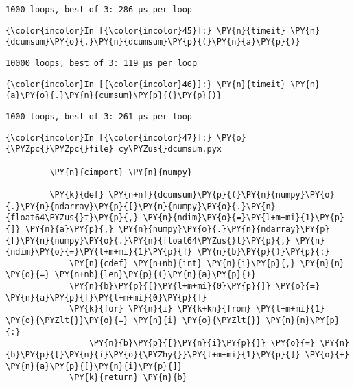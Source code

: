     \begin{Verbatim}[commandchars=\\\{\}]
1000 loops, best of 3: 286 µs per loop

    \end{Verbatim}

    \begin{Verbatim}[commandchars=\\\{\}]
{\color{incolor}In [{\color{incolor}45}]:} \PY{n}{timeit} \PY{n}{dcumsum}\PY{o}{.}\PY{n}{dcumsum}\PY{p}{(}\PY{n}{a}\PY{p}{)}
\end{Verbatim}

    \begin{Verbatim}[commandchars=\\\{\}]
10000 loops, best of 3: 119 µs per loop

    \end{Verbatim}

    \begin{Verbatim}[commandchars=\\\{\}]
{\color{incolor}In [{\color{incolor}46}]:} \PY{n}{timeit} \PY{n}{a}\PY{o}{.}\PY{n}{cumsum}\PY{p}{(}\PY{p}{)}
\end{Verbatim}

    \begin{Verbatim}[commandchars=\\\{\}]
1000 loops, best of 3: 261 µs per loop

    \end{Verbatim}









    \begin{Verbatim}[commandchars=\\\{\}]
{\color{incolor}In [{\color{incolor}47}]:} \PY{o}{\PYZpc{}\PYZpc{}file} cy\PYZus{}dcumsum.pyx
         
         \PY{n}{cimport} \PY{n}{numpy}
         
         \PY{k}{def} \PY{n+nf}{dcumsum}\PY{p}{(}\PY{n}{numpy}\PY{o}{.}\PY{n}{ndarray}\PY{p}{[}\PY{n}{numpy}\PY{o}{.}\PY{n}{float64\PYZus{}t}\PY{p}{,} \PY{n}{ndim}\PY{o}{=}\PY{l+m+mi}{1}\PY{p}{]} \PY{n}{a}\PY{p}{,} \PY{n}{numpy}\PY{o}{.}\PY{n}{ndarray}\PY{p}{[}\PY{n}{numpy}\PY{o}{.}\PY{n}{float64\PYZus{}t}\PY{p}{,} \PY{n}{ndim}\PY{o}{=}\PY{l+m+mi}{1}\PY{p}{]} \PY{n}{b}\PY{p}{)}\PY{p}{:}
             \PY{n}{cdef} \PY{n+nb}{int} \PY{n}{i}\PY{p}{,} \PY{n}{n} \PY{o}{=} \PY{n+nb}{len}\PY{p}{(}\PY{n}{a}\PY{p}{)}
             \PY{n}{b}\PY{p}{[}\PY{l+m+mi}{0}\PY{p}{]} \PY{o}{=} \PY{n}{a}\PY{p}{[}\PY{l+m+mi}{0}\PY{p}{]}
             \PY{k}{for} \PY{n}{i} \PY{k+kn}{from} \PY{l+m+mi}{1} \PY{o}{\PYZlt{}}\PY{o}{=} \PY{n}{i} \PY{o}{\PYZlt{}} \PY{n}{n}\PY{p}{:}
                 \PY{n}{b}\PY{p}{[}\PY{n}{i}\PY{p}{]} \PY{o}{=} \PY{n}{b}\PY{p}{[}\PY{n}{i}\PY{o}{\PYZhy{}}\PY{l+m+mi}{1}\PY{p}{]} \PY{o}{+} \PY{n}{a}\PY{p}{[}\PY{n}{i}\PY{p}{]}
             \PY{k}{return} \PY{n}{b}
\end{Verbatim}

